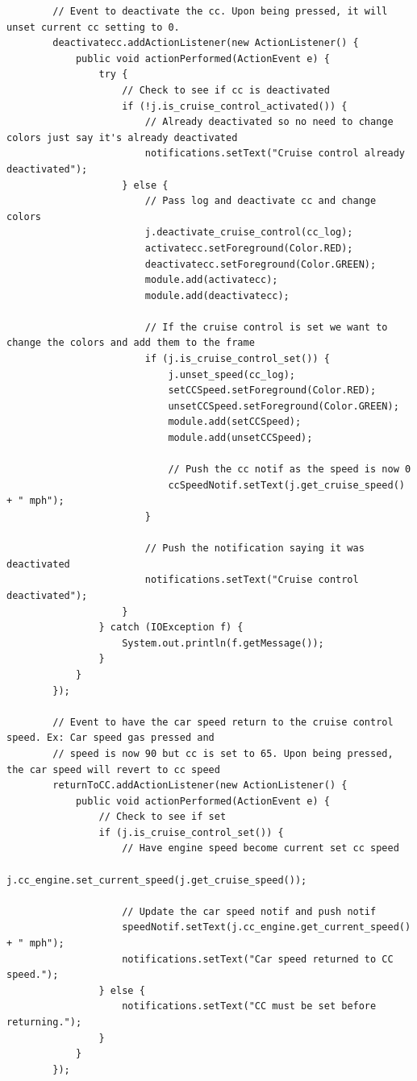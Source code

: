 \documentclass[preprint,11pt,3p]{article}
\begin{document}
\begin{lstlisting}
        // Event to deactivate the cc. Upon being pressed, it will unset current cc setting to 0.
        deactivatecc.addActionListener(new ActionListener() {
            public void actionPerformed(ActionEvent e) {
                try {
                	// Check to see if cc is deactivated
                	if (!j.is_cruise_control_activated()) { 
                		// Already deactivated so no need to change colors just say it's already deactivated
                		notifications.setText("Cruise control already deactivated");
                	} else {
                		// Pass log and deactivate cc and change colors
                		j.deactivate_cruise_control(cc_log);
                    	activatecc.setForeground(Color.RED);
                   		deactivatecc.setForeground(Color.GREEN);
                   		module.add(activatecc);
                    	module.add(deactivatecc);

                    	// If the cruise control is set we want to change the colors and add them to the frame
                    	if (j.is_cruise_control_set()) {
                    		j.unset_speed(cc_log);
                    		setCCSpeed.setForeground(Color.RED);
                    		unsetCCSpeed.setForeground(Color.GREEN);
							module.add(setCCSpeed);
                    		module.add(unsetCCSpeed);

                    		// Push the cc notif as the speed is now 0
                    		ccSpeedNotif.setText(j.get_cruise_speed() + " mph");
                    	}
                    	
                    	// Push the notification saying it was deactivated
                    	notifications.setText("Cruise control deactivated");
                	}
                } catch (IOException f) {
                    System.out.println(f.getMessage());
                }
            }
        });

        // Event to have the car speed return to the cruise control speed. Ex: Car speed gas pressed and 
        // speed is now 90 but cc is set to 65. Upon being pressed, the car speed will revert to cc speed
        returnToCC.addActionListener(new ActionListener() {
        	public void actionPerformed(ActionEvent e) {
        		// Check to see if set
    			if (j.is_cruise_control_set()) {
    				// Have engine speed become current set cc speed
    				j.cc_engine.set_current_speed(j.get_cruise_speed());

    				// Update the car speed notif and push notif
    				speedNotif.setText(j.cc_engine.get_current_speed() + " mph");
    				notifications.setText("Car speed returned to CC speed.");
    			} else {
    				notifications.setText("CC must be set before returning.");
    			}
        	}
        });


\end{lstlisting}
\end{document}
